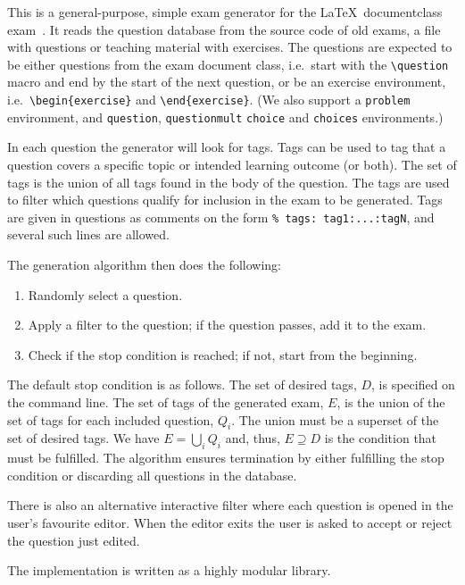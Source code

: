 This is a general-purpose, simple exam generator for the \LaTeX\ documentclass 
exam~\cite{exam}.
It reads the question database from the source code of old exams, a file with 
questions or teaching material with exercises.
The questions are expected to be either questions from the exam document class, 
i.e.\ start with the
\verb'\question'
macro and end by the start of the next question, or be an exercise environment,
i.e.\ \verb'\begin{exercise}'
and
\verb'\end{exercise}'.
(We also support
a \verb'problem' environment,
and \verb'question', \verb'questionmult' \verb'choice' and \verb'choices' 
environments.)

In each question the generator will look for tags.
Tags can be used to tag that a question covers a specific topic or intended 
learning outcome (or both).
The set of tags is the union of all tags found in the body of the question.
The tags are used to filter which questions qualify for inclusion in the exam 
to be generated.
Tags are given in questions as comments on the form
\verb'% tags: tag1:...:tagN',
and several such lines are allowed.

The generation algorithm then does the following:
\begin{enumerate}
\item Randomly select a question.
\item Apply a filter to the question; if the question passes, add it to the 
exam.
\item Check if the stop condition is reached; if not, start from the beginning.
\end{enumerate}
The default stop condition is as follows.
The set of desired tags, \(D\), is specified on the command line.
The set of tags of the generated exam, \(E\), is the union of the set of tags 
for each included question, \(Q_i\).
The union must be a superset of the set of desired tags.
We have \(E = \bigcup_i Q_i\) and, thus, \(E\supseteq D\) is the condition that 
must be fulfilled.
The algorithm ensures termination by either fulfilling the stop condition or 
discarding all questions in the database.

There is also an alternative interactive filter where each question is opened 
in the user's favourite editor.
When the editor exits the user is asked to accept or reject the question just 
edited.

The implementation is written as a highly modular library.
